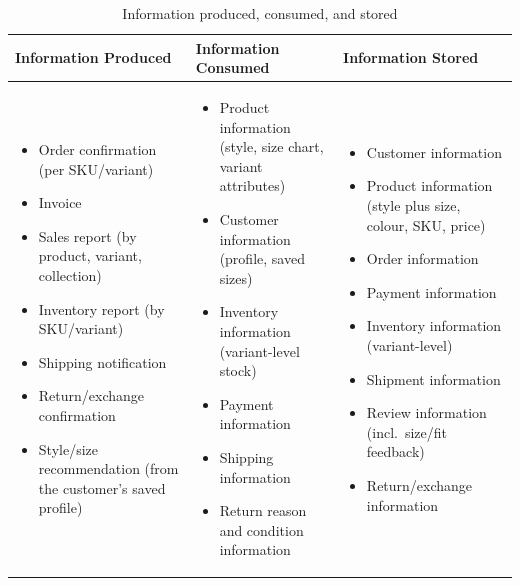\documentclass[11pt,a4paper,oneside]{extreport}
\begin{document}
\begin{table}[H]
\centering
\small
\caption{Information produced, consumed, and stored}
\label{tab:infoclasses}
\begin{tabularx}{\textwidth}{@{}Y Y Y@{}}
\toprule
\textbf{Information Produced} & \textbf{Information Consumed} & \textbf{Information Stored} \\ \midrule
\begin{itemize}[leftmargin=*,nosep,before=\vspace{-\baselineskip}]
 \item Order confirmation (per SKU/variant)
 \item Invoice
 \item Sales report (by product, variant, collection)
 \item Inventory report (by SKU/variant)
 \item Shipping notification
 \item Return/exchange confirmation
 \item Style/size recommendation (from the customer's saved profile)
\end{itemize}
&
\begin{itemize}[leftmargin=*,nosep,before=\vspace{-\baselineskip}]
 \item Product information (style, size chart, variant attributes)
 \item Customer information (profile, saved sizes)
 \item Inventory information (variant-level stock)
 \item Payment information
 \item Shipping information
 \item Return reason and condition information
\end{itemize}
&
\begin{itemize}[leftmargin=*,nosep,before=\vspace{-\baselineskip}]
 \item Customer information
 \item Product information (style plus size, colour, SKU, price)
 \item Order information
 \item Payment information
 \item Inventory information (variant-level)
 \item Shipment information
 \item Review information (incl.\ size/fit feedback)
 \item Return/exchange information
\end{itemize}
\\ \bottomrule
\end{tabularx}
\end{table}
\end{document}
